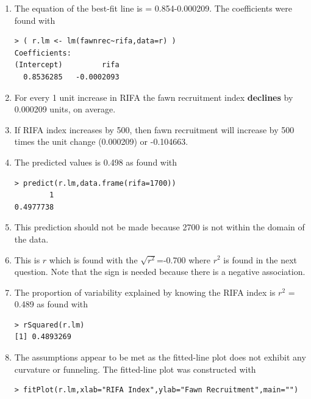 \documentclass[10pt,openany]{book}\usepackage[]{graphicx}\usepackage[]{color}
\makeatletter
\newenvironment{kframe}{%
 \def\at@end@of@kframe{}%
 \ifinner\ifhmode%
  \def\at@end@of@kframe{\end{minipage}}%
  \begin{minipage}{\columnwidth}%
 \fi\fi%
 \def\FrameCommand##1{\hskip\@totalleftmargin \hskip-\fboxsep
 \colorbox{shadecolor}{##1}\hskip-\fboxsep
     \hskip-\linewidth \hskip-\@totalleftmargin \hskip\columnwidth}%
 \MakeFramed {\advance\hsize-\width
   \@totalleftmargin\z@ \linewidth\hsize
   \@setminipage}}%
 {\par\unskip\endMakeFramed%
 \at@end@of@kframe}
\newenvironment{knitrout}{}{} %
\makeatother
\begin{document}
\begin{itemize}
\begin{enumerate}
      \item The equation of the best-fit line is  = 0.854-0.000209.  The coefficients were found with
\begin{knitrout}
\color{fgcolor}\begin{kframe}
\begin{verbatim}
> ( r.lm <- lm(fawnrec~rifa,data=r) )
Coefficients:
(Intercept)         rifa  
  0.8536285   -0.0002093  
\end{verbatim}
\end{kframe}
\end{knitrout}
      \item For every 1 unit increase in RIFA the fawn recruitment index \textbf{declines} by 0.000209 units, on average.
      \item If RIFA index increases by 500, then fawn recruitment will increase by 500 times the unit change (0.000209) or -0.104663.
      \item The predicted values is 0.498 as found with
\begin{knitrout}
\color{fgcolor}\begin{kframe}
\begin{verbatim}
> predict(r.lm,data.frame(rifa=1700))
        1 
0.4977738 
\end{verbatim}
\end{kframe}
\end{knitrout}
      \item This prediction should not be made because 2700 is not within the domain of the data.
      \item This is $r$ which is found with the $\sqrt{r^{2}}$=-0.700 where $r^{2}$ is found in the next question.  Note that the sign is needed because there is a negative association.
      \item The proportion of variability explained by knowing the RIFA index is $r^{2}$ = 0.489 as found with
\begin{knitrout}
\color{fgcolor}\begin{kframe}
\begin{verbatim}
> rSquared(r.lm)
[1] 0.4893269
\end{verbatim}
\end{kframe}
\end{knitrout}
      \item The assumptions appear to be met as the fitted-line plot  does not exhibit any curvature or funneling.  The fitted-line plot was constructed with
\begin{knitrout}
\color{fgcolor}\begin{kframe}
\begin{verbatim}
> fitPlot(r.lm,xlab="RIFA Index",ylab="Fawn Recruitment",main="")
\end{verbatim}
\end{kframe}\begin{figure}[hbtp]


\end{figure}
\end{knitrout}
\end{enumerate}
\end{itemize}
\end{document}
